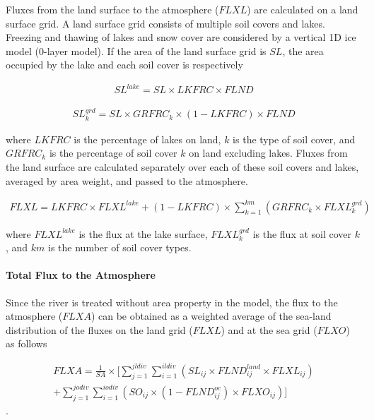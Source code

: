 Fluxes from the land surface to the atmosphere (\(FLXL\)) are calculated on a land surface grid. A land surface grid consists of multiple soil covers and lakes. Freezing and thawing of lakes and snow
cover are considered by a vertical 1D ice model (0-layer model). If the area of the land surface grid is \(SL\), the area occupied by the lake and each soil cover is respectively

\begin{eqnarray} SL^{lake}=SL  \times  LKFRC \times FLND \end{eqnarray}

\begin{eqnarray} SL^{grd}_k = SL \times GRFRC_k \times (1-LKFRC) \times FLND \end{eqnarray}

where \(LKFRC\) is the percentage of lakes on land, \(k\) is the type of soil cover, and \(GRFRC_k\) is the percentage of soil cover \(k\) on land excluding lakes. Fluxes from the land surface are
calculated separately over each of these soil covers and lakes, averaged by area weight, and passed to the atmosphere.

\begin{eqnarray} FLXL = LKFRC \times FLXL^{lake} + (1-LKFRC) \times \sum_{k=1}^{km} (GRFRC_k \times FLXL_k^{grd}) \end{eqnarray}

where \(FLXL^{lake}\) is the flux at the lake surface, \(FLXL_{k}^{grd}\) is the flux at soil cover \(k\), and \(km\) is the number of soil cover types.

\hypertarget{total-flux-to-the-atmosphere}{%
\paragraph{Total Flux to the Atmosphere}\label{total-flux-to-the-atmosphere}}

Since the river is treated without area property in the model, the flux to the atmosphere (\(FLXA\)) can be obtained as a weighted average of the sea-land distribution of the fluxes on the land grid
(\(FLXL\)) and at the sea grid (\(FLXO\)) as follows

\begin{eqnarray} FLXA = \frac{1}{SA} \times [ \sum _ {j=1}^{jldiv} \sum_{i=1}^{ildiv}(SL _ {ij} \times FLND^{land} _ {ij} \times FLXL_{ij}) \\ + \sum _ {j=1}^{jodiv}\sum _ {i=1}^{iodiv }(SO _ {ij} \times (1-FLND^{oc} _ {ij}) \times FLXO _ {ij})] \end{eqnarray}.

